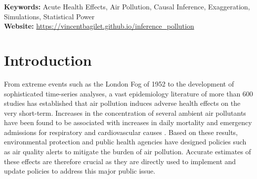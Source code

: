 \documentclass[12pt]{article}
\renewcommand{\thefootnote}{\fnsymbol{footnote}}
\begin{document}
\begin{titlepage}
\begin{abstract}
\end{abstract}
\vspace{0.3cm}
{\selectfont \textbf{Keywords:}} Acute Health Effects, Air Pollution, Causal Inference, Exaggeration, Simulations, Statistical Power\\[3pt] 
{\selectfont \textbf{Website:}} \url{https://vincentbagilet.github.io/inference_pollution}\\[3pt] 
\setcounter{page}{0}
\thispagestyle{empty}
\end{titlepage}
\renewcommand{\thefootnote}{\arabic{footnote}}
\setcounter{footnote}{0}
\pagebreak \newpage

\onehalfspacing




\section{Introduction}
     
    From extreme events such as the London Fog of 1952 to the development of sophisticated time-series analyses, a vast epidemiology literature of more than 600 studies has established that air pollution induces adverse health effects on the very short-term. Increases in the concentration of several ambient air pollutants have been found to be associated with increases in daily mortality and emergency admissions for respiratory and cardiovascular causes \citep{schwartz1994people, samet2000national, le2002short, bell2004time, liu_ambient_2019}. 
    Based on these results, environmental protection and public health agencies have designed policies such as air quality alerts to mitigate the burden of air pollution. Accurate estimates of these effects are therefore crucial as they are directly used to implement and update policies to address this major public issue.
    
\end{document}
